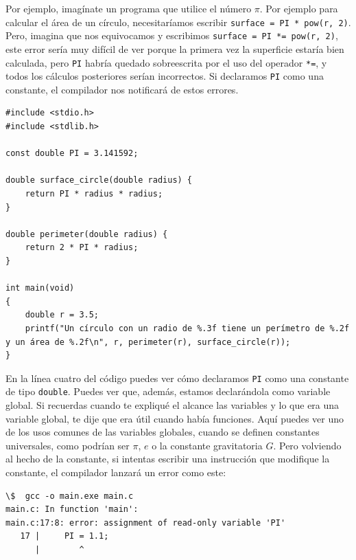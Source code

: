 \documentclass[a4paper]{article}
\begin{document}
Por ejemplo, imagínate un programa que utilice el número $\pi$. Por ejemplo
para calcular el área de un círculo, necesitaríamos escribir
\verb!surface = PI * pow(r, 2)!. Pero, imagina que nos equivocamos y escribimos
\verb!surface = PI *= pow(r, 2)!, este error sería muy difícil de ver porque
la primera vez la superficie estaría bien calculada, pero \verb!PI! habría
quedado sobreescrita por el uso del operador \verb!*=!, y todos los cálculos
posteriores serían incorrectos. Si declaramos \verb!PI! como una constante,
el compilador nos notificará de estos errores.

\noindent
\begin{minipage}[H]{\linewidth}
\mbox{}
\begin{lstlisting}[style=C,
caption={Uso de una constante numérica},
label={lst:constantUsage}]
#include <stdio.h>
#include <stdlib.h>

const double PI = 3.141592;

double surface_circle(double radius) {
    return PI * radius * radius;
}

double perimeter(double radius) {
    return 2 * PI * radius;
}

int main(void)
{
    double r = 3.5;
    printf("Un círculo con un radio de %.3f tiene un perímetro de %.2f y un área de %.2f\n", r, perimeter(r), surface_circle(r));
}
\end{lstlisting}
\end{minipage}

En la línea cuatro del código puedes ver cómo declaramos \verb!PI! como una
constante de tipo \verb!double!. Puedes ver que, además, estamos declarándola
como variable global. Si recuerdas cuando te expliqué el alcance las variables y
lo que era una variable global, te dije que era útil cuando había funciones.
Aquí puedes ver uno de los usos comunes de las variables globales, cuando se
definen constantes universales, como podrían ser $\pi$, $e$ o la constante
gravitatoria $G$. Pero volviendo al hecho de la constante, si intentas escribir
una instrucción que modifique la constante, el compilador lanzará un error como
este:

\noindent
\begin{minipage}[H]{\linewidth}
\mbox{}
\begin{lstlisting}[style=terminalStyle]
\$  gcc -o main.exe main.c
main.c: In function 'main':
main.c:17:8: error: assignment of read-only variable 'PI'
   17 |     PI = 1.1;
      |        ^
\end{lstlisting}
\end{minipage}
\end{document}

